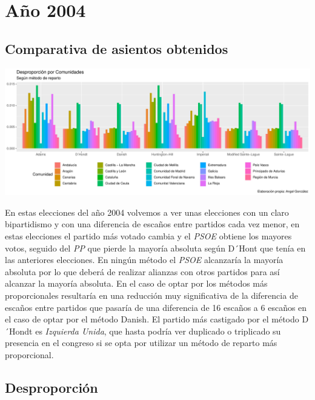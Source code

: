 \documentclass[12pt,a4paper,]{book}
\numberwithin{dummy}{section}
\theoremstyle{ocrenumbox}
\theoremstyle{blacknumex}
\theoremstyle{blacknumbox}
\theoremstyle{ocrenum}
\theoremstyle{ocrenum}
\begin{document}
\hypertarget{auxf1o-2004}{%
\section{Año 2004}\label{auxf1o-2004}}

\hypertarget{comparativa-de-asientos-obtenidos-8}{%
\subsection{Comparativa de asientos
obtenidos}\label{comparativa-de-asientos-obtenidos-8}}

\begin{center}\includegraphics[width=1\linewidth]{figurasR/unnamed-chunk-102-1} \end{center}

En estas elecciones del año 2004 volvemos a ver unas elecciones con un
claro bipartidismo y con una diferencia de escaños entre partidos cada
vez menor, en estas elecciones el partido más votado cambia y el
\emph{PSOE} obtiene los mayores votos, seguido del \emph{PP} que pierde
la mayoría absoluta según D´Hont que tenía en las anteriores elecciones.
En ningún método el \emph{PSOE} alcanzaría la mayoría absoluta por lo
que deberá de realizar alianzas con otros partidos para así alcanzar la
mayoría absoluta. En el caso de optar por los métodos más proporcionales
resultaría en una reducción muy significativa de la diferencia de
escaños entre partidos que pasaría de una diferencia de 16 escaños a 6
escaños en el caso de optar por el método Danish. El partido más
castigado por el método D´Hondt es \emph{Izquierda Unida}, que hasta
podría ver duplicado o triplicado su presencia en el congreso si se opta
por utilizar un método de reparto más proporcional.

\hypertarget{desproporciuxf3n-8}{%
\subsection{Desproporción}\label{desproporciuxf3n-8}}
\end{document}
